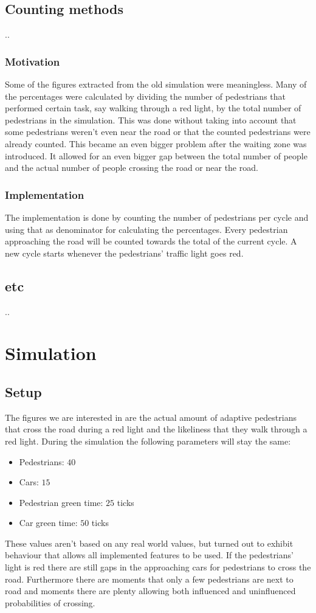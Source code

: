 \documentclass[a4paper]{article}
\begin{document}
\subsection{Counting methods}
..

\subsubsection{Motivation}
Some of the figures extracted from the old simulation were meaningless. Many of the percentages were calculated by dividing the number of pedestrians that performed certain task, say walking through a red light, by the total number of pedestrians in the simulation. This was done without taking into account that some pedestrians weren't even near the road or that the counted pedestrians were already counted.
This became an even bigger problem after the waiting zone was introduced. It allowed for an even bigger gap between the total number of people and the actual number of people crossing the road or near the road.

\subsubsection{Implementation}
The implementation is done by counting the number of pedestrians per cycle and using that as denominator for calculating the percentages. Every pedestrian approaching the road will be counted towards the total of the current cycle. A new cycle starts whenever the pedestrians' traffic light goes red.

\subsection{etc}
..

\clearpage

\section{Simulation}
\subsection{Setup}
The figures we are interested in are the actual amount of adaptive pedestrians that cross the road during a red light and the likeliness that they walk through a red light. During the simulation the following parameters will stay the same:
\begin{itemize}
\item Pedestrians: $40$
\item Cars: $15$
\item Pedestrian green time: $25$ ticks
\item Car green time: $50$ ticks
\end{itemize}
These values aren't based on any real world values, but turned out to exhibit behaviour that allows all implemented features to be used. If the pedestrians' light is red there are still gaps in the approaching cars for pedestrians to cross the road. Furthermore there are moments that only a few pedestrians are next to road and moments there are plenty allowing both influenced and uninfluenced probabilities of crossing. 
\end{document}

